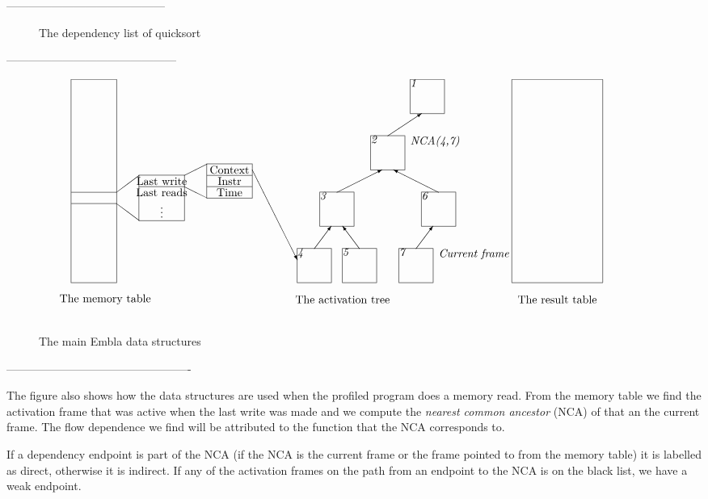 ------------------------------------------

\begin{figure} 
\small

\caption{The dependency list of quicksort}
\label{fquickl}
\end{figure}

---------------------------------------------

\begin{figure*}
\small
\hrulefill
\[
\begin{picture}(500,210)(-30,0)
\put(-30,30){\framebox(40,180)[t]{\ }}
\put(-30,100){\line(1,0){40}}
\put(-30,110){\line(1,0){40}}
\put(-30,10){\makebox(60,10){The memory table}}
\put(10,110){\line(4,3){20}}
\put(10,100){\line(4,-3){20}}
\put(30,85){\framebox(40,40){\ }}
\put(30,115){\line(1,0){40}}
\put(30,115){\makebox(40,10){Last write}}
\put(30,105){\makebox(40,10){Last reads}}
\put(30,90){\makebox(40,10){\vdots}}
\put(70,125){\line(2,1){20}}
\put(70,115){\line(2,-1){20}}
\put(90,105){\framebox(40,30){\ }}
\put(90,125){\line(1,0){40}}
\put(90,115){\line(1,0){40}}
\put(90,105){\makebox(40,10){Time}}
\put(90,115){\makebox(40,10){Instr}}
\put(90,125){\makebox(40,10){Context}}
\put(130,130){\vector(1,-2){40}}
\put(270,180){\framebox(30,30)[tl]{\it 1}}
\put(235,130){\framebox(30,30)[tl]{\it 2}} \put(250,160){\vector(3,2){30}}
\put(270,150){\makebox(50,10)[l]{\it NCA(4,7)}}
\put(190,80){\framebox(30,30)[tl]{\it 3}} \put(205,110){\vector(2,1){40}}
\put(280,80){\framebox(30,30)[tl]{\it 6}} \put(295,110){\vector(-2,1){40}}
\put(170,30){\framebox(30,30)[tl]{\it 4}} \put(185,60){\vector(3,4){15}}
\put(210,30){\framebox(30,30)[tl]{\it 5}} \put(225,60){\vector(-3,4){15}}
\put(260,30){\framebox(30,30)[tl]{\it 7}} \put(275,60){\vector(3,4){15}}
\put(295,50){\makebox(50,10)[l]{\it Current frame}}
\put(170,10){\makebox(80,10){The activation tree}}
\put(360,30){\framebox(80,180){\ }}
\put(360,10){\makebox(80,10){The result table}}

\end{picture}
\]
\hrulefill
\caption{The main Embla data structures}
\label{fembladata}
\end{figure*}


-------------------------------------------------

The figure also shows how the data structures are used when the
profiled program does a memory read. From the memory table we find the
activation frame that was active when the last write was made and we
compute the {\em nearest common ancestor} (NCA) of that an the
current frame. The flow dependence we find will be attributed to the
function that the NCA corresponds to. 

If a dependency endpoint is part of the NCA (if the NCA is the current
frame or the frame pointed to from the memory table) it is labelled as
direct, otherwise it is indirect. If any of the activation frames on
the path from an endpoint to the NCA is on the black list, we have a
weak endpoint.
